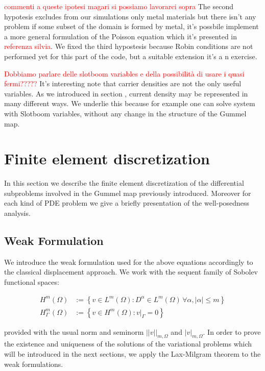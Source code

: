 \textcolor{red}{commenti a queste ipotesi magari si possiamo lavorarci sopra}
The second hypotesis excludes from our simulations only metal materials but there isn't any problem if some subset of the domain is formed by metal, it's possbile implement a more general formulation of the Poisson equation which it's presented in \textcolor{red}{referenza silvia}.
We fixed the third hypostesis because Robin conditions are not performed yet for this part of the code, but a suitable extension it's a n exercise.
 
\textcolor{red}{Dobbiamo parlare delle slotboom variables e della possibilità di usare i quasi fermi?????}
It's interesting note that carrier densities are not the only useful variables. As we introduced in section , current density may be represented in many different ways.  We underlie this because for example one can solve system  with Slotboom variables, without any change in the structure of the Gummel map.


\section{Finite element discretization}

In this section we describe the finite element discretization of the differential subproblems involved in the Gummel map previously introduced. Moreover for each kind of PDE problem we give a briefly presentation of the well-posedness analysis. 


\subsection{Weak Formulation}

We introduce the weak formulation used for the above equations accordingly to the classical displacement approach. We work with the sequent family of Sobolev functional spaces:

\begin{align}
H^m(\Omega) & := \left\{  v \in L^m(\Omega) : D^\alpha \in L^m(\Omega) \, \forall \alpha, |\alpha|\leq m\right\}
\\
H^m_{\Gamma}(\Omega) & := \left\{  v \in H^m(\Omega) : v|_{\Gamma} = 0 \right\}
\end{align} 

provided with the usual norm and seminorm $|| v ||_{m,\Omega}$ and $|v|_{m,\Omega}$.
In order to prove the existence and uniqueness of the solutions of the variational problems which will be introduced in the next sections, we apply the Lax-Milgram theorem \cite{salsa:EDP} to the weak formulations.

